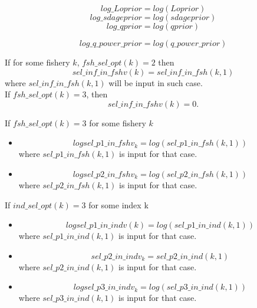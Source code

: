 \documentclass{article}
\begin{document}
\begin{equation}
    log\_Loprior = log(Loprior)
\end{equation}
\begin{equation}
    log\_sdageprior = log(sdageprior)
\end{equation}
\begin{equation}
    log\_qprior = log(qprior)
\end{equation}

\begin{equation}
    log\_q\_power\_prior = log(q\_power\_prior)
\end{equation}

If for some fishery $k$, $fsh\_sel\_opt(k)=2$ then
\begin{equation}
    sel\_inf\_in\_fshv(k)=sel\_inf\_in\_fsh(k,1) 
\end{equation}
where $sel\_inf\_in\_fsh(k,1) $ will be input in such case.\\
If $fsh\_sel\_opt(k)=3$, then 
\begin{equation}
    sel\_inf\_in\_fshv(k)=0.
\end{equation}


If $fsh\_sel\_opt(k)=3$ for some fishery $k$
\begin{itemize}
    \item \begin{equation}
    logsel\_p1\_in\_fshv_k = log(sel\_p1\_in\_fsh(k,1)) 
\end{equation}
where $sel\_p1\_in\_fsh(k,1)$ is input for that case.

\item \begin{equation}
 logsel\_p2\_in\_fshv_k =    log(sel\_p2\_in\_fsh(k,1))   
\end{equation}
where $sel\_p2\_in\_fsh(k,1)$ is input for that case.
\end{itemize}



If $ind\_sel\_opt(k)=3$ for some index k
\begin{itemize}
\item \begin{equation}
    logsel\_p1\_in\_indv(k) = log (sel\_p1\_in\_ind(k,1))
\end{equation} 
where $sel\_p1\_in\_ind(k,1)$ is input for that case.

\item \begin{equation}
sel\_p2\_in\_indv_k = sel\_p2\_in\_ind(k,1)
\end{equation} 
where $sel\_p2\_in\_ind(k,1)$ is input for that case.

\item \begin{equation}
    logsel\_p3\_in\_indv_k = log(sel\_p3\_in\_ind(k,1))
\end{equation}
where $sel\_p3\_in\_ind(k,1)$ is input for that case.

\end{itemize}
\end{document}

